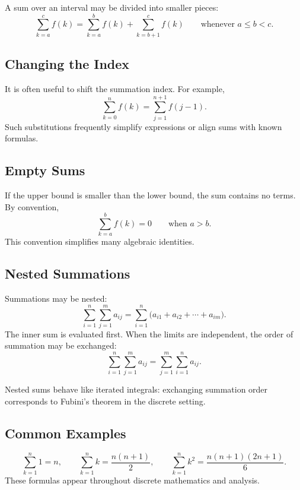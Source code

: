 \begin{remark*}
A sum over an interval may be divided into smaller pieces:
\[
\sum_{k=a}^{c} f(k)
=
\sum_{k=a}^{b} f(k)
+
\sum_{k=b+1}^{c} f(k)
\qquad \text{whenever } a \le b < c.
\]
\end{remark*}

\subsection*{Changing the Index}

\begin{remark*}
It is often useful to shift the summation index. For example,
\[
\sum_{k=0}^{n} f(k) = \sum_{j=1}^{n+1} f(j-1).
\]
Such substitutions frequently simplify expressions or align sums
with known formulas.
\end{remark*}

\subsection*{Empty Sums}

\begin{remark*}
If the upper bound is smaller than the lower bound, the sum contains
no terms. By convention,
\[
\sum_{k=a}^{b} f(k) = 0 \qquad \text{when } a > b.
\]
This convention simplifies many algebraic identities.
\end{remark*}

\subsection*{Nested Summations}

\begin{remark*}
Summations may be nested:
\[
\sum_{i=1}^{n} \sum_{j=1}^{m} a_{ij}
= \sum_{i=1}^{n}\bigl(a_{i1} + a_{i2} + \cdots + a_{im}\bigr).
\]
The inner sum is evaluated first. When the limits are independent,
the order of summation may be exchanged:
\[
\sum_{i=1}^{n}\sum_{j=1}^{m} a_{ij}
=
\sum_{j=1}^{m}\sum_{i=1}^{n} a_{ij}.
\]
\end{remark*}

\begin{remark*}
Nested sums behave like iterated integrals: exchanging summation order
corresponds to Fubini's theorem in the discrete setting.
\end{remark*}

\subsection*{Common Examples}

\begin{remark*}
\[
\sum_{k=1}^{n} 1 = n, \qquad
\sum_{k=1}^{n} k = \frac{n(n+1)}{2}, \qquad
\sum_{k=1}^{n} k^2 = \frac{n(n+1)(2n+1)}{6}.
\]
These formulas appear throughout discrete mathematics and analysis.
\end{remark*}
